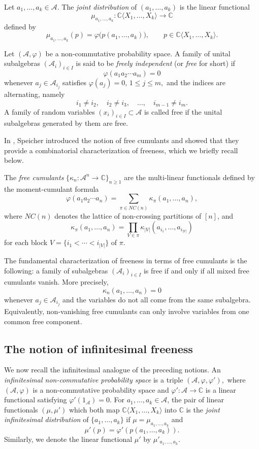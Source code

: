 \documentclass{article}
\theoremstyle{definition}
\begin{document}
Let $a_1,\ldots,a_k\in\mathcal A$. The \emph{joint distribution} of
$(a_1,\ldots,a_k)$ is the linear functional
\[
\mu_{a_1,\ldots,a_k}:
\mathbb{C}\langle X_1,\ldots,X_k\rangle
\to
\mathbb C
\]
defined by
\[
\mu_{a_1,\ldots,a_k}(p)
=
\varphi\bigl(p(a_1,\ldots,a_k)\bigr),
\qquad
p\in\mathbb C\langle X_1,\ldots,X_k\rangle.
\]

Let $(\mathcal A,\varphi)$ be a non-commutative probability space. A family of
unital subalgebras $(\mathcal A_i)_{i\in I}$ is said to be \emph{freely independent} (or \emph{free} for short) if
$$
\varphi(a_1a_2\cdots a_m)=0
$$
whenever $a_j\in \mathcal A_{i_j}$ satisfies
$
\varphi(a_j)=0$, $1\le j\le m,$ and the indices are alternating, namely
\[
i_1\neq i_2,\quad i_2\neq i_3,\quad \ldots,\quad i_{m-1}\neq i_m.
\]
A family of random variables $(x_i)_{i\in I}\subset \mathcal A$ is called free
if the unital subalgebras generated by them are free.

In \cite{Speicher94}, Speicher introduced the notion of free cumulants and showed that they provide a combinatorial characterization of freeness, which we briefly recall below. 

The \emph{free cumulants}
$
\{\kappa_n:\mathcal A^n\to \mathbb C\}_{n\geq 1}
$
are the multi-linear functionals defined by the moment-cumulant formula
\[
\varphi(a_1a_2\cdots a_n)
=
\sum_{\pi\in NC(n)}
\kappa_\pi(a_1,\ldots,a_n),
\]
where $NC(n)$ denotes the lattice of non-crossing partitions of $[n]$, and
\[
\kappa_\pi(a_1,\ldots,a_n)
=
\prod_{V\in \pi}
\kappa_{|V|}(a_{i_1},\ldots,a_{i_{|V|}})
\]
for each block $V=\{i_1<\cdots<i_{|V|}\}$ of $\pi$.

The fundamental characterization of freeness in terms of free cumulants is the
following: a family of subalgebras $(\mathcal A_i)_{i\in I}$ is free if and only
if all mixed free cumulants vanish. More precisely,
\[
\kappa_n(a_1,\ldots,a_n)=0
\]
whenever $a_j\in \mathcal A_{i_j}$ and the variables do not all come from the
same subalgebra. Equivalently, non-vanishing free cumulants can only involve
variables from one common free component.

\subsection{The notion of infinitesimal freeness}

We now recall the infinitesimal analogue of the preceding notions. An
\emph{infinitesimal non-commutative probability space} is a triple
$(\mathcal A,\varphi,\varphi'),$
where $(\mathcal A,\varphi)$ is a non-commutative probability space and
$\varphi':\mathcal A\to\mathbb C$ is a linear functional satisfying
$
\varphi'(1_{\mathcal A})=0.
$
For $a_1,\dots,a_k\in \mathcal{A}$, the pair of linear functionals $(\mu,\mu')$ which both map $\mathbb{C}\langle X_1,\dots,X_k\rangle$ into $\mathbb{C}$ is the \textit{joint infinitesimal distribution} of $\{a_1,\dots,a_k\}$ if $\mu=\mu_{a_1,\dots,a_k}$ and
$$
\mu'(p)=\varphi'(p(a_1,\dots,a_k)).
$$
Similarly, we denote the linear functional $\mu'$ by $\mu'_{a_1,\dots,a_k}.$
\end{document}
